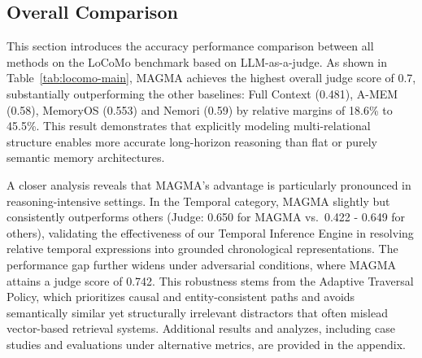 \documentclass[11pt]{article}
\begin{document}
\subsection{Overall Comparison}
This section introduces the accuracy performance comparison between all methods on the LoCoMo benchmark based on LLM-as-a-judge. As shown in Table~\ref{tab:locomo-main}, MAGMA achieves the highest overall judge score of 0.7, substantially outperforming the other baselines: Full Context (0.481), A-MEM (0.58), MemoryOS (0.553) and Nemori (0.59) by relative margins of 18.6\% to 45.5\%. This result demonstrates that explicitly modeling multi-relational structure enables more accurate long-horizon reasoning than flat or purely semantic memory architectures.

A closer analysis reveals that MAGMA’s advantage is particularly pronounced in reasoning-intensive settings. In the Temporal category, MAGMA slightly but consistently outperforms others (Judge: 0.650 for MAGMA vs.\ 0.422 - 0.649 for others), validating the effectiveness of our Temporal Inference Engine in resolving relative temporal expressions into grounded chronological representations. The performance gap further widens under adversarial conditions, where MAGMA attains a judge score of 0.742. This robustness stems from the Adaptive Traversal Policy, which prioritizes causal and entity-consistent paths and avoids semantically similar yet structurally irrelevant distractors that often mislead vector-based retrieval systems. Additional results and analyzes, including case studies and evaluations under alternative metrics, are provided in the appendix.
\end{document}
